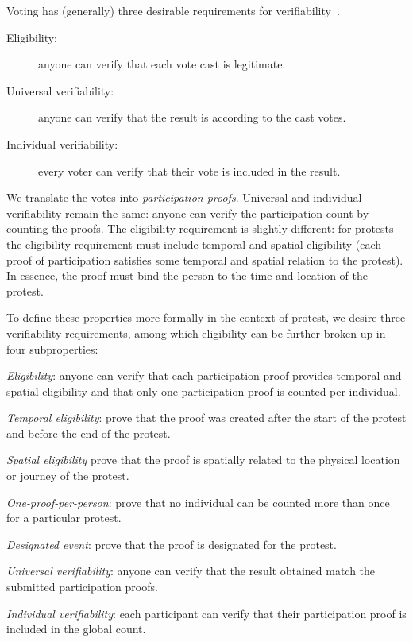 Voting has (generally) three desirable requirements for verifiability~\cite{VerifyingPrivacyPropertiesOfVotingProtocols}.
\begin{description}
  \item[Eligibility:] anyone can verify that each vote cast is legitimate.
  \item[Universal verifiability:] anyone can verify that the result is according 
    to the cast votes.
  \item[Individual verifiability:] every voter can verify that their vote is 
    included in the result.
\end{description}
We translate the votes into \emph{participation proofs}.
Universal and individual verifiability remain the same: anyone can verify the participation count by counting the proofs.
The eligibility requirement is slightly different: for protests the eligibility requirement must include temporal and spatial 
eligibility (\ie each proof of participation satisfies some temporal and spatial relation to the protest).
In essence, the proof must bind the person to the time and location of the protest.

To define these properties more formally in the context of protest, we desire three verifiability requirements, among which eligibility can be further broken up in four subproperties:
\begin{requirements}[V]
  \item\label{EligibilityVerif} \emph{Eligibility}: anyone can verify that each 
    participation proof provides temporal and spatial eligibility and that only 
    one participation proof is counted per individual.
    \begin{requirements}
    \item \emph{Temporal eligibility}:%
      \label{CreatedAfterStart} prove that the proof was created after the start of the protest and
      before the end of the protest.
    \item \emph{Spatial eligibility}
      \label{SpatiallyRelated} prove that the proof is spatially related to the physical location or journey of the protest.
    \item \emph{One-proof-per-person}:%
      \label{CountOnce} prove that no individual can be counted more than once for a particular protest.
    \item \emph{Designated event}:%
      \label{DesignatedEvent} prove that the proof is designated for the protest.
    \end{requirements}

  \item\label{UniversalVerif} \emph{Universal verifiability}: anyone can verify that the result obtained match the submitted participation proofs.
  \item\label{IndividualVerif} \emph{Individual verifiability}: each participant can verify that their participation proof is included in the global count.
\end{requirements}

